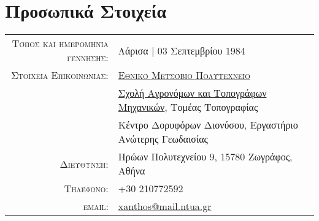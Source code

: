 \documentclass[a4paper,10pt]{article} %
\begin{document}


\par{\bigskip\par} %

\section{Προσωπικά Στοιχεία}

\begin{tabular}{rl}
  \textsc{Τόπος και ημερομηνία γέννησης:} & Λάρισα | 03 Σεπτεμβρίου 1984\\
  \textsc{Στοιχεία Επικοινωνίας:}
  & \textsc{\href{http://www.ntua.gr/}{Εθνικό Μετσόβιο Πολυτεχνείο}} \\
  & \href{http://www.survey.ntua.gr/}{Σχολή Αγρονόμων και Τοπογράφων Μηχανικών}, Τομέας Τοπογραφίας\\
  & Κέντρο Δορυφόρων Διονύσου, Εργαστήριο Ανώτερης Γεωδαισίας \\
  \textsc{Διεύθυνση:} & Ηρώων Πολυτεχνείου 9, 15780 Ζωγράφος, Αθήνα \\
  \textsc{Τηλέφωνο:} & +30 210772592\\
  \textsc{email:} & \href{mailto:xanthos@mail.ntua.gr}{xanthos@mail.ntua.gr}
\end{tabular}
\medskip

\end{document}

